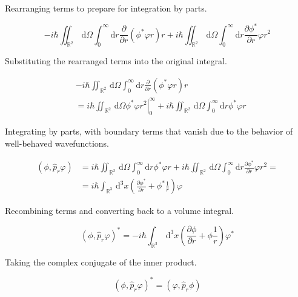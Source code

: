 Rearranging terms to prepare for integration by parts.

\begin{equation}
-i \hbar \iint_{\mathbb{R}^{2}} \, \mathrm{d} \Omega \int_{0}^{\infty} \mathrm{d} r \frac{\partial}{\partial r}\left(\phi^{*} \varphi r\right) r+i \hbar \iint_{\mathbb{R}^{2}} \, \mathrm{d} \Omega \int_{0}^{\infty} \mathrm{d} r \frac{\partial \phi^{*}}{\partial r} \varphi r^{2}
\end{equation}

Substituting the rearranged terms into the original integral.

\begin{align}
& -i \hbar \iint_{\mathbb{R}^{2}} \, \mathrm{d} \Omega \int_{0}^{\infty} \mathrm{d} r \frac{\partial}{\partial r}\left(\phi^{*} \varphi r\right) r \\
& =\left.i \hbar \iint_{\mathbb{R}^{2}} \, \mathrm{d} \Omega \phi^{*} \varphi r^{2}\right|_{0} ^{\infty}+i \hbar \iint_{\mathbb{R}^{2}} \, \mathrm{d} \Omega \int_{0}^{\infty} \mathrm{d} r \phi^{*} \varphi r
\end{align}

Integrating by parts, with boundary terms that vanish due to the behavior of well-behaved wavefunctions.

\begin{align}
\left(\phi, \hat{p}_{r} \varphi\right) & =i \hbar \iint_{\mathbb{R}^{2}} \, \mathrm{d} \Omega \int_{0}^{\infty} \mathrm{d} r \phi^{*} \varphi r+i \hbar \iint_{\mathbb{R}^{2}} \, \mathrm{d} \Omega \int_{0}^{\infty} \mathrm{d} r \frac{\partial \phi^{*}}{\partial r} \varphi r^{2}=  \\
& =i \hbar \int_{\mathbb{R}^{3}} \, \mathrm{d}^{3} x\left(\frac{\partial \phi^{*}}{\partial r}+\phi^{*} \frac{1}{r}\right) \varphi
\end{align}

Recombining terms and converting back to a volume integral.

\begin{equation}
\left(\phi, \hat{p}_{r} \varphi\right)^{*}=-i \hbar \int_{\mathbb{R}^{3}} \, \mathrm{d}^{3} x\left(\frac{\partial \phi}{\partial r}+\phi \frac{1}{r}\right) \varphi^{*}
\end{equation}

Taking the complex conjugate of the inner product.

\begin{equation}
\left(\phi, \hat{p}_{r} \varphi\right)^{*}=\left(\varphi, \hat{p}_{r} \phi\right)
\end{equation}

